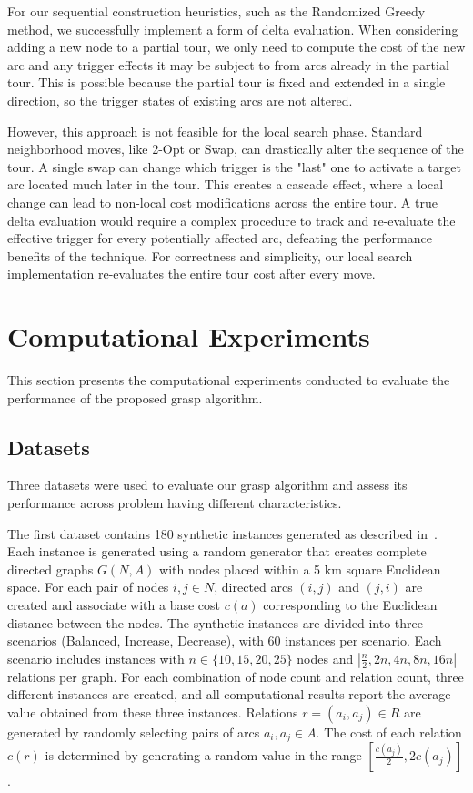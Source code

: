 \documentclass[twocolumn, switch]{article} %
\begin{document}
For our sequential construction heuristics, such as the Randomized Greedy method, we successfully implement a form of delta evaluation. When considering adding a new node to a partial tour, we only need to compute the cost of the new arc and any trigger effects it may be subject to from arcs already in the partial tour. This is possible because the partial tour is fixed and extended in a single direction, so the trigger states of existing arcs are not altered.

However, this approach is not feasible for the local search phase. Standard neighborhood moves, like 2-Opt or Swap, can drastically alter the sequence of the tour. A single swap can change which trigger is the "last" one to activate a target arc located much later in the tour. This creates a cascade effect, where a local change can lead to non-local cost modifications across the entire tour. A true delta evaluation would require a complex procedure to track and re-evaluate the effective trigger for every potentially affected arc, defeating the performance benefits of the technique. For correctness and simplicity, our local search implementation re-evaluates the entire tour cost after every move.

\section{Computational Experiments}
This section presents the computational experiments conducted to evaluate the performance of the proposed \gls{grasp} algorithm.

\subsection{Datasets}

Three datasets were used to evaluate our \gls{grasp} algorithm and assess its performance across problem having different characteristics.

The first dataset contains 180 synthetic instances generated as described in~\citet{Cerrone}.
Each instance is generated using a random generator that creates complete directed graphs $G(N,A)$ 
with nodes placed within a 5 km square Euclidean space. 
For each pair of nodes $i, j \in N$, directed arcs $(i, j)$ and $(j, i)$ are created and associate with a base cost $c(a)$ 
corresponding to the Euclidean distance between the nodes. The synthetic instances are divided into three scenarios 
(Balanced, Increase, Decrease), with 60 instances per scenario. Each scenario includes instances with $n \in \{10, 15, 20, 25\}$ 
nodes and $|\frac{n}{2}, 2n, 4n, 8n, 16n|$ relations per graph. For each combination of node count and relation count, three 
different instances are created, and all computational results report the average value obtained from these three instances.
Relations $r = (a_i, a_j) \in R$ are generated by randomly selecting pairs of arcs $a_i, a_j \in A$. The cost of each relation $c(r)$ 
is determined by generating a random value in the range $[\frac{c(a_j)}{2}, 2c(a_j)]$.
\end{document}
